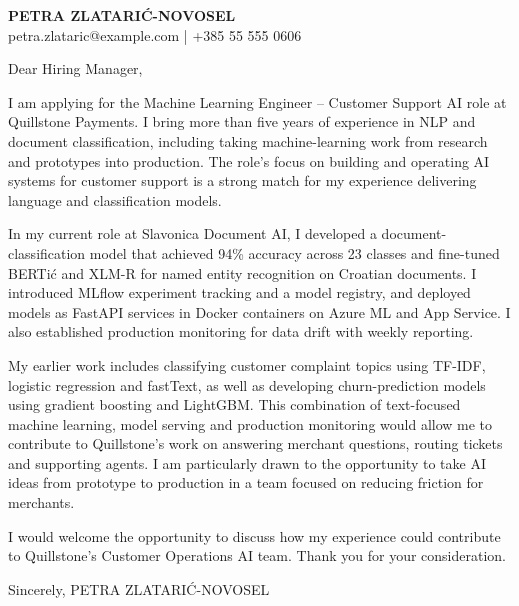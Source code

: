 \documentclass[11pt,a4paper]{article}
\begin{document}
{\Large\bfseries\color{primarycolor} PETRA ZLATARIĆ-NOVOSEL}\\
petra.zlataric@example.com | +385 55 555 0606

Dear Hiring Manager,

I am applying for the Machine Learning Engineer – Customer Support AI role at Quillstone Payments. I bring more than five years of experience in NLP and document classification, including taking machine-learning work from research and prototypes into production. The role’s focus on building and operating AI systems for customer support is a strong match for my experience delivering language and classification models.

In my current role at Slavonica Document AI, I developed a document-classification model that achieved 94\% accuracy across 23 classes and fine-tuned BERTić and XLM-R for named entity recognition on Croatian documents. I introduced MLflow experiment tracking and a model registry, and deployed models as FastAPI services in Docker containers on Azure ML and App Service. I also established production monitoring for data drift with weekly reporting.

My earlier work includes classifying customer complaint topics using TF-IDF, logistic regression and fastText, as well as developing churn-prediction models using gradient boosting and LightGBM. This combination of text-focused machine learning, model serving and production monitoring would allow me to contribute to Quillstone’s work on answering merchant questions, routing tickets and supporting agents. I am particularly drawn to the opportunity to take AI ideas from prototype to production in a team focused on reducing friction for merchants.

I would welcome the opportunity to discuss how my experience could contribute to Quillstone’s Customer Operations AI team. Thank you for your consideration.

Sincerely,
PETRA ZLATARIĆ-NOVOSEL
\end{document}
